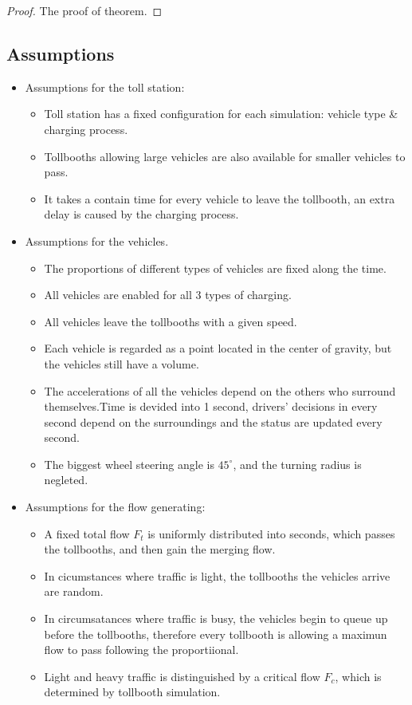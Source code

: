 \documentclass{mcmthesis}
\begin{document}
\begin{proof}
The proof of theorem.
\end{proof}

\subsection{Assumptions}

\begin{itemize}
	\item Assumptions for the toll station:
	\begin{itemize}
         \item Toll station has a fixed configuration for each simulation: vehicle type & charging process.
         \item Tollbooths allowing large vehicles are also available for smaller vehicles to pass.
       	 \item It takes a contain time for every vehicle to leave the tollbooth, an extra delay is caused by the charging process.
	\end{itemize}

    \item Assumptions for the vehicles.
    \begin{itemize}
    	\item The proportions of different types of vehicles are fixed along the time.
    	\item All vehicles are enabled for all 3 types of charging.
    	\item All vehicles leave the tollbooths with a given speed.
    	\item Each vehicle is regarded as a point located in the center of gravity, but the vehicles still have a volume.
    	\item The accelerations of all the vehicles depend on the others who surround themselves.Time is devided into 1 second, drivers' decisions in every second depend on the surroundings and the status are updated every second.
    	\item The biggest wheel steering angle is $45^{\circ}$, and the turning radius is negleted.
    	
    \end{itemize}
    \item Assumptions for the flow generating:
    \begin{itemize}
    \item A fixed total flow $F_t$ is uniformly distributed into seconds, which passes the tollbooths, and then gain the merging flow.
   	\item In cicumstances where traffic is light, the tollbooths the vehicles arrive are random.
    \item In circumsatances where traffic is busy, the vehicles begin to queue up before the tollbooths, therefore every tollbooth is allowing a maximun flow to pass following the proportiional.
    \item Light and heavy traffic is distinguished by a critical flow  $F_c$, which is determined by tollbooth simulation.
    \end{itemize}
	
	
\end{itemize}
\end{document}
